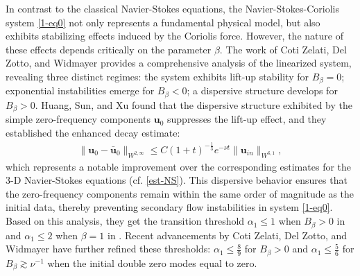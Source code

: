 \documentclass[11pt,reqno]{article}
\numberwithin{equation}{section}
\newcommand\uu{\bm{u}}
\let\pa=\partial
\begin{document}



In contrast to the classical Navier-Stokes equations, the Navier-Stokes-Coriolis system \eqref{1-eq0} not only represents  a fundamental physical model,  but also exhibits stabilizing effects induced by the Coriolis force. However, the nature of these effects depends critically on the parameter $\beta$. The work of Coti Zelati, Del Zotto, and Widmayer \cite{Coti-Zotto-Widmayer-2025} provides a comprehensive analysis of the linearized system, revealing three distinct regimes: the system exhibits lift-up stability for $B_\beta=0$; exponential instabilities emerge for $B_\beta<0$; a dispersive structure develops  for $B_\beta>0$. 
Huang, Sun, and Xu \cite{Huang-Sun-Xu, Huang-Sun-Xu-1} found that the dispersive structure exhibited by the simple zero-frequency components $\uu_0$ suppresses the lift-up effect, and they established the 
enhanced decay estimate:
\begin{align*}
\| \uu_0-\bar{\uu}_0\|_{W^{2,\infty}} \leq C (1+t)^{-\frac13} e^{-\nu t} \|\uu_{in}\|_{W^{6,1}},
\end{align*}
which represents a notable improvement over the corresponding estimates for the 3-D Navier-Stokes equations (cf. \eqref{est-NS}). This dispersive behavior ensures that the zero-frequency components remain within the same order of magnitude as the initial data, thereby preventing secondary flow instabilities in system \eqref{1-eq0}. Based on this analysis, they get the transition threshold $\alpha_1\leq 1$ when $B_\beta>0$ in \cite{Huang-Sun-Xu} and $\alpha_1\leq 2$ when $\beta=1$ in \cite{Huang-Sun-Xu-1}. 
Recent advancements by Coti Zelati, Del Zotto, and Widmayer \cite{Coti-Zotto-Widmayer-2025} have further refined these thresholds: $\alpha_1\leq \frac 89$ for $B_\beta>0$ and $\alpha_1\leq \frac 56$ for $B_\beta\gtrsim\nu^{-1}$ when the initial double zero modes equal to zero. 
\end{document}
